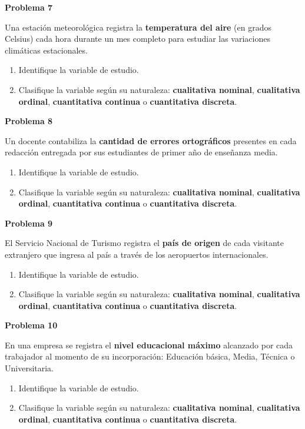 \documentclass[10pt,letterpaper]{article}
\newcommand{\problema}[1]{%
  \vspace{2pt}%
  \begin{tcolorbox}[
    enhanced,
    colback=white,
    colframe=black,
    arc=0pt,
    boxrule=0pt,
    leftrule=2pt,
    left=6pt, right=6pt,
    top=1pt, bottom=1pt,
  ]
    {\normalsize\bfseries\sffamily #1}
  \end{tcolorbox}%
  \vspace{1pt}%
}
\begin{document}
\problema{Problema 7}
\noindent\sffamily\small Una estaci\'on meteorol\'ogica registra la \textbf{temperatura del aire} (en grados Celsius) cada hora durante un mes completo para estudiar las variaciones clim\'aticas estacionales.
\begin{enumerate}[leftmargin=1.2cm, label=\textbf{\alph*)}, itemsep=0pt, topsep=2pt]
  \item Identifique la variable de estudio.
  \item Clasifique la variable seg\'un su naturaleza: \textbf{cualitativa nominal}, \textbf{cualitativa ordinal}, \textbf{cuantitativa continua} o \textbf{cuantitativa discreta}.
\end{enumerate}

\problema{Problema 8}
\noindent\sffamily\small Un docente contabiliza la \textbf{cantidad de errores ortogr\'aficos} presentes en cada redacci\'on entregada por sus estudiantes de primer a\~no de ense\~nanza media.
\begin{enumerate}[leftmargin=1.2cm, label=\textbf{\alph*)}, itemsep=0pt, topsep=2pt]
  \item Identifique la variable de estudio.
  \item Clasifique la variable seg\'un su naturaleza: \textbf{cualitativa nominal}, \textbf{cualitativa ordinal}, \textbf{cuantitativa continua} o \textbf{cuantitativa discreta}.
\end{enumerate}

\problema{Problema 9}
\noindent\sffamily\small El Servicio Nacional de Turismo registra el \textbf{pa\'is de origen} de cada visitante extranjero que ingresa al pa\'is a trav\'es de los aeropuertos internacionales.
\begin{enumerate}[leftmargin=1.2cm, label=\textbf{\alph*)}, itemsep=0pt, topsep=2pt]
  \item Identifique la variable de estudio.
  \item Clasifique la variable seg\'un su naturaleza: \textbf{cualitativa nominal}, \textbf{cualitativa ordinal}, \textbf{cuantitativa continua} o \textbf{cuantitativa discreta}.
\end{enumerate}

\problema{Problema 10}
\noindent\sffamily\small En una empresa se registra el \textbf{nivel educacional m\'aximo} alcanzado por cada trabajador al momento de su incorporaci\'on: Educaci\'on b\'asica, Media, T\'ecnica o Universitaria.
\begin{enumerate}[leftmargin=1.2cm, label=\textbf{\alph*)}, itemsep=0pt, topsep=2pt]
  \item Identifique la variable de estudio.
  \item Clasifique la variable seg\'un su naturaleza: \textbf{cualitativa nominal}, \textbf{cualitativa ordinal}, \textbf{cuantitativa continua} o \textbf{cuantitativa discreta}.
\end{enumerate}
\end{document}
